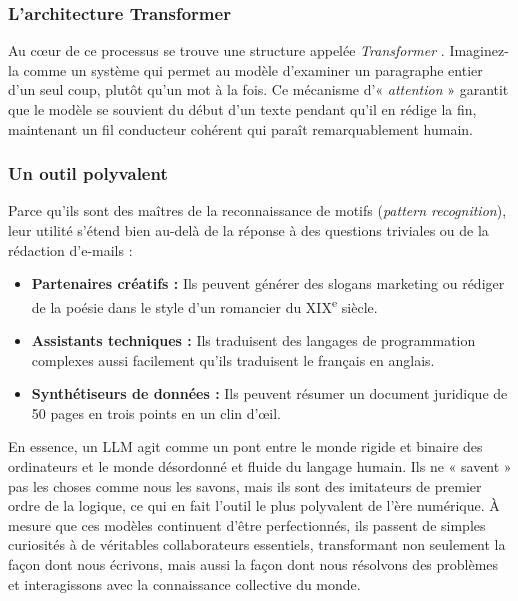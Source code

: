 \documentclass[a4paper,11pt]{article}
\begin{document}
\subsubsection{L'architecture Transformer}

Au cœur de ce processus se trouve une structure appelée \emph{Transformer}
\cite{vaswani2017attention}. Imaginez-la comme un système qui permet au modèle
d'examiner un paragraphe entier d'un seul coup, plutôt qu'un mot à la fois.
Ce mécanisme d'« \emph{attention} » garantit que le modèle se souvient du
début d'un texte pendant qu'il en rédige la fin, maintenant un fil conducteur
cohérent qui paraît remarquablement humain.

\subsubsection{Un outil polyvalent}

Parce qu'ils sont des maîtres de la reconnaissance de motifs (\emph{pattern
recognition}), leur utilité s'étend bien au-delà de la réponse à des questions
triviales ou de la rédaction d'e-mails :

\begin{itemize}
  \item \textbf{Partenaires créatifs :} Ils peuvent générer des slogans
    marketing ou rédiger de la poésie dans le style d'un romancier du
    XIX\textsuperscript{e} siècle.
  \item \textbf{Assistants techniques :} Ils traduisent des langages de
    programmation complexes aussi facilement qu'ils traduisent le français en
    anglais.
  \item \textbf{Synthétiseurs de données :} Ils peuvent résumer un document
    juridique de 50 pages en trois points en un clin d'œil.
\end{itemize}

En essence, un LLM agit comme un pont entre le monde rigide et binaire des
ordinateurs et le monde désordonné et fluide du langage humain. Ils ne
« savent » pas les choses comme nous les savons, mais ils sont des imitateurs
de premier ordre de la logique, ce qui en fait l'outil le plus polyvalent de
l'ère numérique. À mesure que ces modèles continuent d'être perfectionnés, ils
passent de simples curiosités à de véritables collaborateurs essentiels,
transformant non seulement la façon dont nous écrivons, mais aussi la façon
dont nous résolvons des problèmes et interagissons avec la connaissance
collective du monde.

\newpage
\end{document}
